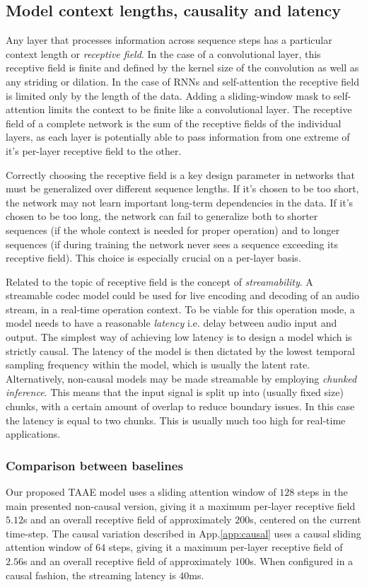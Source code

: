 \documentclass{article} %
\begin{document}
\subsection{Model context lengths, causality and latency}
\label{app:receptive_field}
Any layer that processes information across sequence steps has a particular context length or \emph{receptive field}. In the case of a convolutional layer, this receptive field is finite and defined by the kernel size of the convolution as well as any striding or dilation. In the case of RNNs and self-attention the receptive field is limited only by the length of the data. Adding a sliding-window mask to self-attention limits the context to be finite like a convolutional layer. The receptive field of a complete network is the sum of the receptive fields of the individual layers, as each layer is potentially able to pass information from one extreme of it's per-layer receptive field to the other.

Correctly choosing the receptive field is a key design parameter in networks that must be generalized over different sequence lengths. If it's chosen to be too short, the network may not learn important long-term dependencies in the data. If it's chosen to be too long, the network can fail to generalize both to shorter sequences (if the whole context is needed for proper operation) and to longer sequences (if during training the network never sees a sequence exceeding its receptive field). This choice is especially crucial on a per-layer basis.

Related to the topic of receptive field is the concept of \emph{streamability}. A streamable codec model could be used for live encoding and decoding of an audio stream, in a real-time operation context. To be viable for this operation mode, a model needs to have a reasonable \emph{latency} i.e. delay between audio input and output. The simplest way of achieving low latency is to design a model which is strictly causal. The latency of the model is then dictated by the lowest temporal sampling frequency within the model, which is usually the latent rate. Alternatively, non-causal models may be made streamable by employing \emph{chunked inference}. This means that the input signal is split up into (usually fixed size) chunks, with a certain amount of overlap to reduce boundary issues. In this case the latency is equal to two chunks. This is usually much too high for real-time applications.

\subsubsection{Comparison between baselines}
Our proposed TAAE model uses a sliding attention window of $128$ steps in the main presented non-causal version, giving it a maximum per-layer receptive field $5.12$\si{\second} and an overall receptive field of approximately $200$\si{\second}, centered on the current time-step. The causal variation described in App.\ref{app:causal} uses a causal sliding attention window of $64$ steps, giving it a maximum per-layer receptive field of $2.56$\si{\second} and an overall receptive field of approximately $100$\si{\second}. When configured in a causal fashion, the streaming latency is $40$\si{\milli\second}.
\end{document}

